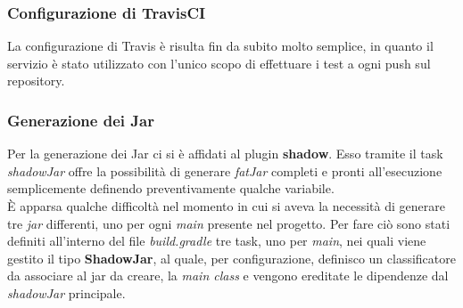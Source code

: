 	
	\subsubsection{Configurazione di TravisCI}
	  La configurazione di Travis è risulta fin da subito molto semplice, in quanto il servizio è stato utilizzato con l'unico scopo di effettuare i test a ogni push sul repository.
	 
	\subsubsection{Generazione dei Jar} 
	  Per la generazione dei Jar ci si è affidati al plugin \textbf{shadow}. Esso tramite il task \textit{shadowJar}
	  offre la possibilità di generare \textit{fatJar} completi e pronti all'esecuzione semplicemente definendo preventivamente qualche variabile. \\
	  È apparsa qualche difficoltà nel momento in cui si aveva la necessità di generare tre \textit{jar} differenti, uno per ogni \textit{main} presente nel progetto. 
	  Per fare ciò sono stati definiti all'interno del file \textit{build.gradle} tre task, uno per \textit{main}, nei quali viene gestito il tipo \textbf{ShadowJar}, 
	  al quale, per configurazione, definisco un classificatore da associare al jar da creare, la \textit{main class} 
	  e vengono ereditate le dipendenze dal \textit{shadowJar} principale.
	  
